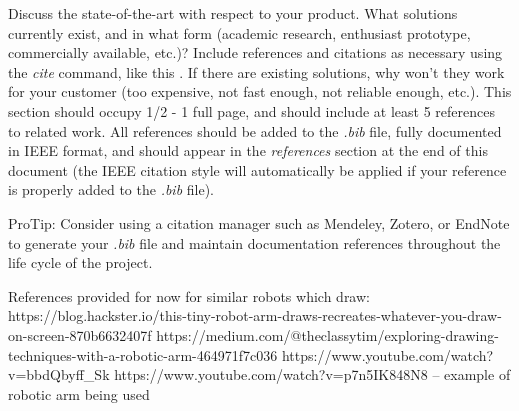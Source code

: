 Discuss the state-of-the-art with respect to your product. What solutions currently exist, and in what form (academic research, enthusiast prototype, commercially available, etc.)? Include references and citations as necessary using the \textit{cite} command, like this \cite{Rubin2012}. If there are existing solutions, why won't they work for your customer (too expensive, not fast enough, not reliable enough, etc.). This section should occupy 1/2 - 1 full page, and should include at least 5 references to related work. All references should be added to the \textit{.bib} file, fully documented in IEEE format, and should appear in the \textit{references} section at the end of this document (the IEEE citation style will automatically be applied if your reference is properly added to the \textit{.bib} file).

ProTip: Consider using a citation manager such as Mendeley, Zotero, or EndNote to generate your \textit{.bib} file and maintain documentation references throughout the life cycle of the project.


References provided for now for similar robots which draw: 
https://blog.hackster.io/this-tiny-robot-arm-draws-recreates-whatever-you-draw-on-screen-870b6632407f
https://medium.com/@theclassytim/exploring-drawing-techniques-with-a-robotic-arm-464971f7c036
https://www.youtube.com/watch?v=bbdQbyff_Sk 
https://www.youtube.com/watch?v=p7n5IK848N8 – example of robotic arm being used
